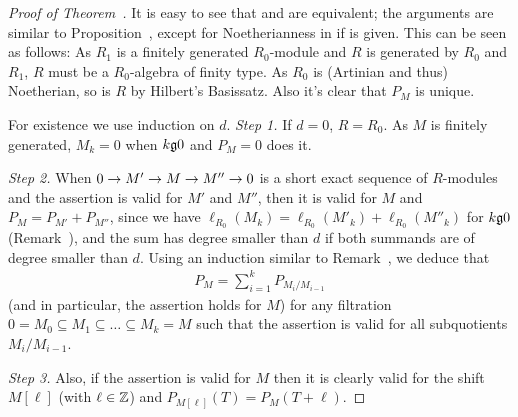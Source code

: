 \documentclass[a4paper,parskip=half,numbers=enddot, DIV=12]{scrreprt}
\begin{document}
\begin{proof}[Proof of Theorem~]
    It is easy to see that  and  are equivalent; the arguments are similar to Proposition~, except for Noetherianness in  if  is given. This can be seen as follows: As $R_1$ is a finitely generated $R_0$-module and $R$ is generated by $R_0$ and $R_1$, $R$ must be a $R_0$-algebra of finity type. As $R_0$ is (Artinian and thus) Noetherian, so is $R$ by Hilbert's Basissatz. Also it's clear that $P_M$ is unique.
    
    For existence we use induction on $d$. \emph{Step 1.} If $d=0$, $R=R_0$. As $M$ is finitely generated, $M_k = 0$ when $k\gge0$ and $P_M =0$ does it. 
    
    \emph{Step 2.} When $0\morphism M'\morphism M\morphism M'' \morphism 0$ is a short exact sequence of $R$-modules and the assertion is valid for $M'$ and $M''$, then it is valid for $M$ and $P_M = P_{M'} +P_{M''}$, since we have $\ell_{R_0}(M_k) = \ell_{R_0}(M'_k)+\ell_{R_0}(M''_k) $ for $k\gge 0$ (Remark~), and the sum has degree smaller than $d$ if both summands are of degree smaller than $d$. Using an induction similar to Remark~, we deduce that 
    \begin{align*}
    	P_M=\sum_{i=1}^kP_{M_i/M_{i-1}}
    \end{align*}
    (and in particular, the assertion holds for $M$) for any filtration $0=M_0\subseteq M_1\subseteq\ldots\subseteq M_k=M$ such that the assertion is valid for all subquotients $M_i/M_{i-1}$. 
    
    \emph{Step 3.} Also, if the assertion is valid for $M$ then it is clearly valid for the shift $M[\ell]$ (with $\ell\in\mathbb{Z}$) and $P_{M[\ell]}(T) = P_M(T+\ell)$. 
    

\end{proof}
\end{document}
